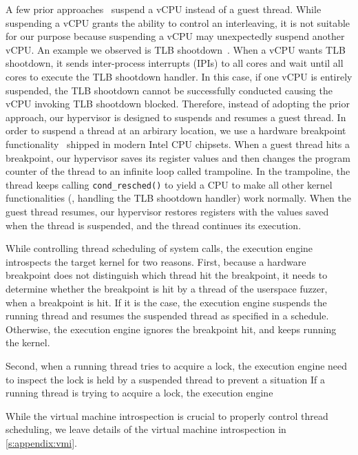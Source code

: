 %
A few prior approaches~\cite{ski, snowboard, razzer} suspend a vCPU
instead of a guest thread. While suspending a vCPU grants the ability
to control an interleaving, it is not suitable for our purpose because
suspending a vCPU may unexpectedly suspend another vCPU. An example we
observed is TLB shootdown~\cite{tlbshootdown}. When a vCPU wants TLB
shootdown, it sends inter-process interrupts (IPIs) to all cores and
wait until all cores to execute the TLB shootdown handler.  In this
case, if one vCPU is entirely suspended, the TLB shootdown cannot be
successfully conducted causing the vCPU invoking TLB shootdown
blocked.
%
Therefore, instead of adopting the prior approach, our hypervisor is
designed to suspends and resumes a guest thread.
%
In order to suspend a thread at an arbirary location, we use a
hardware breakpoint functionality~\cite{hwbp} shipped in modern Intel
CPU chipsets.
%
When a guest thread hits a breakpoint, our hypervisor saves its
register values and then changes the program counter of the thread to
an infinite loop called trampoline. In the trampoline, the thread
keeps calling \texttt{cond_resched()} to yield a CPU to make all other
kernel functionalities (\eg, handling the TLB shootdown handler) work
normally. When the guest thread resumes, our hypervisor restores
registers with the values saved when the thread is suspended, and the
thread continues its execution.


%
While controlling thread scheduling of system calls, the execution
engine introspects the target kernel for two reasons.
%
First, because a hardware breakpoint does not distinguish which thread
hit the breakpoint, it needs to determine whether the breakpoint is
hit by a thread of the userspace fuzzer, when a breakpoint is hit.
%
If it is the case, the execution engine suspends the running thread
and resumes the suspended thread as specified in a schedule.
%
Otherwise, the execution engine ignores the breakpoint hit, and keeps
running the kernel.


%
Second, when a running thread tries to acquire a lock, the execution
engine need to inspect the lock is held by a suspended thread to
prevent a situation 
%
If a running thread is trying to acquire a lock, the execution engine 



While the virtual machine introspection is crucial to properly control
thread scheduling, we leave details of the virtual machine
introspection in \autoref{s:appendix:vmi}.



